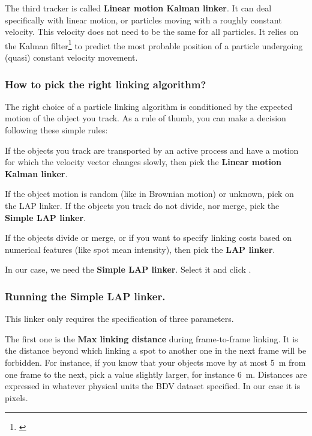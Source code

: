The third tracker is called \textbf{Linear motion Kalman linker}.
It can deal specifically with linear motion, or particles moving with a roughly constant velocity.
This velocity does not need to be the same for all particles. 
It relies on the Kalman filter\footnote{\href{https://en.wikipedia.org/wiki/Kalman_filter}{}} to predict the most probable position of a particle undergoing (quasi) constant velocity movement.

\subsubsection{How to pick the right linking algorithm?}

The right choice of a particle linking algorithm is conditioned by the expected motion of the object you track.
As a rule of thumb, you can make a decision following these simple rules:
\begin{myitemize}
    
    \item If the objects you track are transported by an active process and have a motion for which the velocity vector changes slowly, then pick the  \textbf{Linear motion Kalman linker}.
    
    \item If the object motion is random (like in Brownian motion) or unknown, pick on the LAP linker. If the objects you track do not divide, nor merge, pick the \textbf{Simple LAP linker}.
    
    \item If the objects divide or merge, or if you want to specify linking costs based on numerical features (like spot mean intensity), then pick the \textbf{LAP linker}.
    
\end{myitemize}
In our case, we need the \textbf{Simple LAP linker}. Select it and click .

\subsubsection{Running the Simple LAP linker.}

This linker only requires the specification of three parameters.

The first one is the \textbf{Max linking distance} during frame-to-frame linking. 
It is the distance beyond which linking a spot to another one in the next frame will be forbidden. 
For instance, if you know that your objects move by at most 5~{\textmu}m from one frame to the next, pick a value slightly larger, for instance 6~{\textmu}m.
Distances are expressed in whatever physical units the BDV dataset specified.
In our case it is pixels. 

